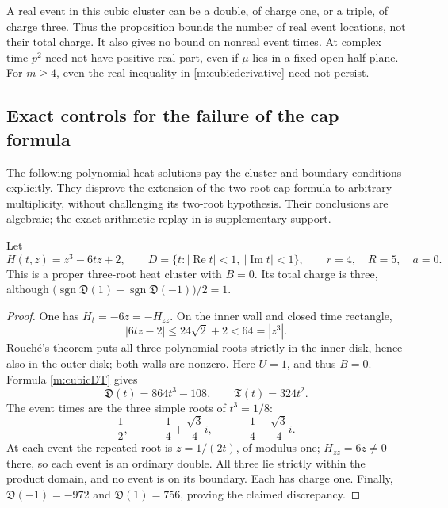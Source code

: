 A real event in this cubic cluster can be a double, of charge one,
or a triple, of charge three.  Thus the proposition bounds the number
of real event locations, not their total charge.  It also gives no
bound on nonreal event times.  At complex time $p^2$ need not have
positive real part, even if $\mu$ lies in a fixed open half-plane.
For $m\geq4$, even the real inequality in
\eqref{m:cubicderivative} need not persist.

\subsection{Exact controls for the failure of the cap formula}

The following polynomial heat solutions pay the cluster and boundary
conditions explicitly.  They disprove the extension of the two-root
cap formula to arbitrary multiplicity, without challenging its
two-root hypothesis.  Their conclusions are algebraic; the exact
arithmetic replay in \cite{controls} is supplementary support.

\begin{proposition}
\label{m:cubiccontrol}
Let
\[
 H(t,z)=z^3-6tz+2,\qquad
 D=\{t:|\operatorname{Re}t|<1,\ |\operatorname{Im}t|<1\},
 \qquad r=4,\quad R=5,\quad a=0.
\]
This is a proper three-root heat cluster with $B=0$.  Its
total charge is three, although
$\bigl(\operatorname{sgn}\mathfrak D(1)
       -\operatorname{sgn}\mathfrak D(-1)\bigr)/2=1$.
\end{proposition}
\begin{proof}
One has $H_t=-6z=-H_{zz}$.  On the inner wall and closed time
rectangle,
\[
 |6tz-2|\leq24\sqrt2+2<64=|z^3|.
\]
Rouch\'e's theorem puts all three polynomial roots strictly in the
inner disk, hence also in the outer disk; both walls are nonzero.
Here $U=1$, and thus $B=0$.  Formula
\eqref{m:cubicDT} gives
\[
 \mathfrak D(t)=864t^3-108,
 \qquad \mathfrak T(t)=324t^2.
\]
The event times are the three simple roots of $t^3=1/8$:
\[
 \frac12,\qquad -\frac14+\frac{\sqrt3}{4}i,
 \qquad -\frac14-\frac{\sqrt3}{4}i.
\]
At each event the repeated root is $z=1/(2t)$, of modulus one;
$H_{zz}=6z\ne0$ there, so each event is an ordinary double.  All
three lie strictly within the product domain, and no event is on its
boundary.  Each has charge one.  Finally,
$\mathfrak D(-1)=-972$ and $\mathfrak D(1)=756$, proving the
claimed discrepancy.
\end{proof}

